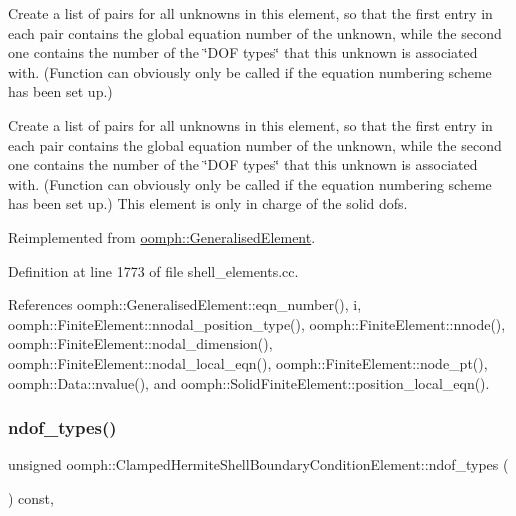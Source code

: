 Create a list of pairs for all unknowns in this element, so that the first entry in each pair contains the global equation number of the unknown, while the second one contains the number of the \char`\"{}\+D\+O\+F types\char`\"{} that this unknown is associated with. (Function can obviously only be called if the equation numbering scheme has been set up.) 

Create a list of pairs for all unknowns in this element, so that the first entry in each pair contains the global equation number of the unknown, while the second one contains the number of the \char`\"{}\+D\+O\+F types\char`\"{} that this unknown is associated with. (Function can obviously only be called if the equation numbering scheme has been set up.) This element is only in charge of the solid dofs. 

Reimplemented from \hyperlink{classoomph_1_1GeneralisedElement_a069f59bfc3e607a5bebba52c6314d777}{oomph\+::\+Generalised\+Element}.



Definition at line 1773 of file shell\+\_\+elements.\+cc.



References oomph\+::\+Generalised\+Element\+::eqn\+\_\+number(), i, oomph\+::\+Finite\+Element\+::nnodal\+\_\+position\+\_\+type(), oomph\+::\+Finite\+Element\+::nnode(), oomph\+::\+Finite\+Element\+::nodal\+\_\+dimension(), oomph\+::\+Finite\+Element\+::nodal\+\_\+local\+\_\+eqn(), oomph\+::\+Finite\+Element\+::node\+\_\+pt(), oomph\+::\+Data\+::nvalue(), and oomph\+::\+Solid\+Finite\+Element\+::position\+\_\+local\+\_\+eqn().

\mbox{\label{classoomph_1_1ClampedHermiteShellBoundaryConditionElement_a189db759eda561b5ae63ae9527b3ae39}} 
\subsubsection{\texorpdfstring{ndof\+\_\+types()}{ndof\_types()}}
{\footnotesize\ttfamily unsigned oomph\+::\+Clamped\+Hermite\+Shell\+Boundary\+Condition\+Element\+::ndof\+\_\+types (\begin{DoxyParamCaption}{ }\end{DoxyParamCaption}) const\hspace{0.3cm}{\ttfamily [inline]}, {\ttfamily [virtual]}}



